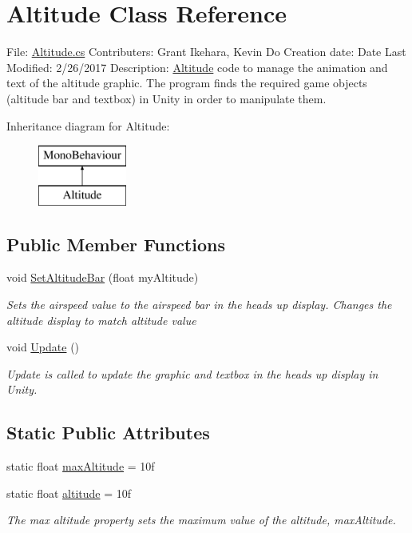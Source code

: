 \hypertarget{class_altitude}{}\section{Altitude Class Reference}
\label{class_altitude}


File\+: \hyperlink{_altitude_8cs}{Altitude.\+cs} Contributers\+: Grant Ikehara, Kevin Do Creation date\+: Date Last Modified\+: 2/26/2017 Description\+: \hyperlink{class_altitude}{Altitude} code to manage the animation and text of the altitude graphic. The program finds the required game objects (altitude bar and textbox) in Unity in order to manipulate them.  


Inheritance diagram for Altitude\+:\begin{figure}[H]
\begin{center}
\leavevmode
\includegraphics[height=2.000000cm]{class_altitude}
\end{center}
\end{figure}
\subsection*{Public Member Functions}
\begin{DoxyCompactItemize}
\item 
void \hyperlink{class_altitude_a3d4e8f7adf282747e565285b467826d8}{Set\+Altitude\+Bar} (float my\+Altitude)
\begin{DoxyCompactList}\small\item\em Sets the airspeed value to the airspeed bar in the heads up display. Changes the altitude display to match altitude value \end{DoxyCompactList}\item 
void \hyperlink{class_altitude_ae8b828d3dd00635459030c41e28ca771}{Update} ()
\begin{DoxyCompactList}\small\item\em Update is called to update the graphic and textbox in the heads up display in Unity. \end{DoxyCompactList}\end{DoxyCompactItemize}
\subsection*{Static Public Attributes}
\begin{DoxyCompactItemize}
\item 
static float \hyperlink{class_altitude_a729301c655fbbb37140cb45ed5ad5292}{max\+Altitude} = 10f
\item 
static float \hyperlink{class_altitude_ac0178e16c5daaf6a463572ed64fa48d5}{altitude} = 10f
\begin{DoxyCompactList}\small\item\em The max altitude property sets the maximum value of the altitude, max\+Altitude. \end{DoxyCompactList}\end{DoxyCompactItemize}


